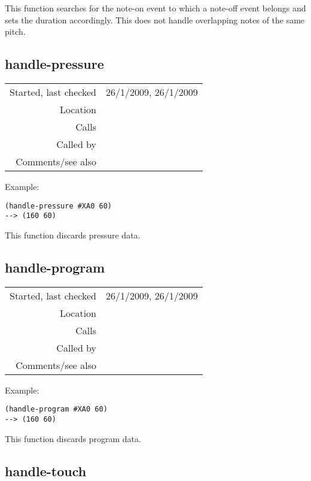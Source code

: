 \noindent This function searches for the note-on event
to which a note-off event belongs and sets the
duration accordingly. This does not handle overlapping
notes of the same pitch.


\subsection*{handle-pressure}\label{fun:handle-pressure}

\vspace{0.3cm}
\begin{tabular}{r|p{8cm}}
Started, last checked & 26/1/2009, 26/1/2009 \\
Location & \nameref{sec:MIDI-import} \\
Calls & \\
Called by & \nameref{fun:parse-events} \\
Comments/see also &
\end{tabular}

\vspace{0.5cm}
\noindent Example:
\begin{verbatim}
(handle-pressure #XA0 60)
--> (160 60)
\end{verbatim}

\noindent This function discards pressure data.


\subsection*{handle-program}\label{fun:handle-program}

\vspace{0.3cm}
\begin{tabular}{r|p{8cm}}
Started, last checked & 26/1/2009, 26/1/2009 \\
Location & \nameref{sec:MIDI-import} \\
Calls & \\
Called by & \nameref{fun:parse-events} \\
Comments/see also &
\end{tabular}

\vspace{0.5cm}
\noindent Example:
\begin{verbatim}
(handle-program #XA0 60)
--> (160 60)
\end{verbatim}

\noindent This function discards program data.


\subsection*{handle-touch}\label{fun:handle-touch}

